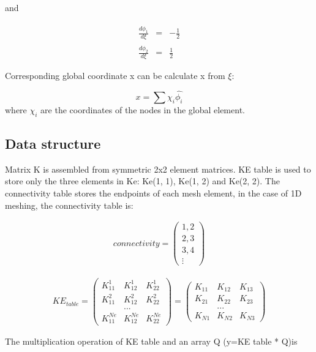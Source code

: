 \documentclass[paper=a4, fontsize=11pt]{article} %
\begin{document}
and

\begin{eqnarray}
\frac{d\hat{\phi_1}}{d\xi} &=& -\frac{1}{2}\nonumber\\
\frac{d\hat{\phi_2}}{d\xi} &=& \frac{1}{2}
\end{eqnarray}

Corresponding global coordinate x can be calculate x from $\xi$:

\begin{equation}
x = \sum{\chi _i \hat{\phi _i}}
\end{equation} 
where $\chi_i$ are the coordinates of the nodes in the global element. 

\subsection{Data structure}

Matrix K is assembled from symmetric 2x2 element matrices. KE table is used to store only the three elements in Ke: Ke(1, 1), Ke(1, 2) and Ke(2, 2). The connectivity table stores the endpoints of each mesh element, in the case of 1D meshing, the connectivity table is: 

\begin{eqnarray}
connectivity = 
    \begin{pmatrix}
    1, 2\\
    2, 3\\
    3, 4\\
    \vdots
    \end{pmatrix}
\end{eqnarray}

\begin{eqnarray}
KE_{table} = 
\begin{pmatrix}
K_{11}^1& K_{12}^1& K_{22}^1 \\
K_{11}^2& K_{12}^2& K_{22}^2 \\
 &...&\\
K_{11}^{Ne}& K_{12}^{Ne}& K_{22}^{Ne}         
\end{pmatrix}
=
\begin{pmatrix}
K_{11} & K_{12} & K_{13}\\
K_{21} & K_{22} & K_{23} \\
 &...&\\
K_{N1}& K_{N2} & K_{N3}         
\end{pmatrix}
\end{eqnarray}

The multiplication operation of KE table and an array Q (y=KE table * Q)is 
\end{document}
